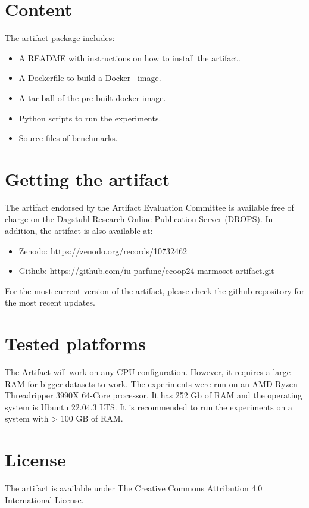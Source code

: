 \documentclass[a4paper,UKenglish, authorcolumns]{darts-v2021}
\newenvironment{content}{\section{Content}}{}
\newenvironment{getting}{\section{Getting the artifact} The artifact 
endorsed by the Artifact Evaluation Committee is available free of 
charge on the Dagstuhl Research Online Publication Server (DROPS).}{}
\newenvironment{platforms}{\section{Tested platforms}}{}
\newcommand{\license}[1]{{\section{License}#1}}
\begin{document}
\begin{content}
The artifact package includes:
\begin{itemize}
\item A README with instructions on how to install the artifact.
\item A Dockerfile to build a Docker~\cite{merkel2014docker} image. 
\item A tar ball of the pre built docker image.
\item Python scripts to run the experiments.
\item Source files of benchmarks. 
\end{itemize}
\end{content}

\begin{getting}
In addition, the artifact is also available at:
\begin{itemize}
\item Zenodo: \url{https://zenodo.org/records/10732462}
\item Github: \url{https://github.com/iu-parfunc/ecoop24-marmoset-artifact.git}
\end{itemize}
For the most current version of the artifact, please check the github repository 
for the most recent updates.
\end{getting}

\begin{platforms}
The Artifact will work on any CPU configuration. However, it requires a large RAM for bigger 
datasets to work. The experiments were run on an AMD Ryzen Threadripper 3990X 64-Core processor.
It has 252 Gb of RAM and the operating system is Ubuntu 22.04.3 LTS.
It is recommended to run the experiments on a system with > 100 GB of RAM. 
\end{platforms}

\license{The artifact is available under The Creative Commons Attribution 4.0 International License.~\cite{CC-Liscense}}
\end{document}
